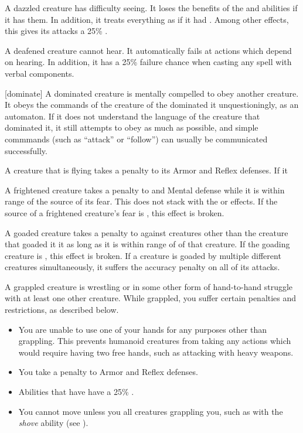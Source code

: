      A dazzled creature has difficulty seeing.
    It loses the benefits of the  and  abilities if it has them.
    In addition, it treats everything as if it had .
    Among other effects, this gives its  attacks a 25\% .

     A deafened creature cannot hear. It automatically fails at actions which depend on hearing. In addition, it has a 25\% failure chance when casting any spell with verbal components.

    [dominate] A dominated creature is mentally compelled to obey another creature.
    It obeys the commands of the creature of the dominated it unquestioningly, as an automaton.
    If it does not understand the language of the creature that dominated it, it still attempts to obey as much as possible, and simple commmands (such as ``attack'' or ``follow'') can usually be communicated successfully.

     A creature that is flying takes a  penalty to its Armor and Reflex defenses.
    If it 

     A frightened creature takes a  penalty to  and Mental defense while it is within \rngmed range of the source of its fear.
    This does not stack with the \shaken or \panicked effects.
    If the source of a frightened creature's fear is , this effect is broken.

     A goaded creature takes a  penalty to  against creatures other than the creature that goaded it it as long as it is within \rngmed range of of that creature.
    If the goading creature is , this effect is broken.
    If a creature is goaded by multiple different creatures simultaneously, it suffers the accuracy penalty on all of its attacks.

     A grappled creature is wrestling or in some other form of hand-to-hand struggle with at least one other creature.
    While grappled, you suffer certain penalties and restrictions, as described below.
    \begin{itemize}
        \item You are unable to use one of your hands for any purposes other than grappling.
            This prevents humanoid creatures from taking any actions which would require having two free hands, such as attacking with heavy weapons.
        \item You take a  penalty to Armor and Reflex defenses.
        \item Abilities that have  have a 25\% .
        \item You cannot move unless you  all creatures grappling you, such as with the \textit{shove} ability (see ).
    \end{itemize}

